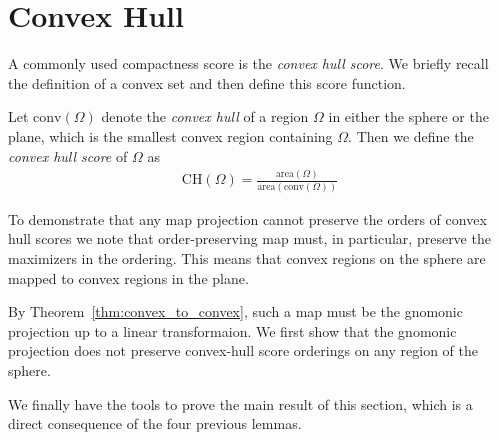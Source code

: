 \section{Convex Hull}\label{sec:ch}
A commonly used compactness score is the \textit{convex hull
score}.  We briefly recall the definition of a convex set and then
define this score function.

\begin{definition}
  Let $\mathrm{conv}(\Omega)$ denote the \textit{convex hull} of
  a region $\Omega$ in either the sphere or the plane, which is the
  smallest convex region containing $\Omega$.  Then we define the
  \textit{convex hull score} of $\Omega$ as 
  \begin{align*}
    \mathrm{CH}(\Omega)=
    \frac{\mathrm{area}(\Omega)}{\mathrm{area}(\mathrm{conv}(\Omega))}
  \end{align*}
\end{definition}

To demonstrate that any map projection cannot preserve
the orders of convex hull scores we note that  
order-preserving map must, in particular, preserve the 
maximizers in the ordering. This means that convex
regions on the sphere are mapped to convex regions in the plane.

By Theorem~\ref{thm:convex_to_convex}, such a map 
must be the gnomonic projection up to a linear transformaion. 
We first show that the gnomonic projection does not preserve 
convex-hull score orderings on any region of the sphere.


We finally have the tools to prove the main result of this section,
which is a direct consequence of the four previous lemmas.

